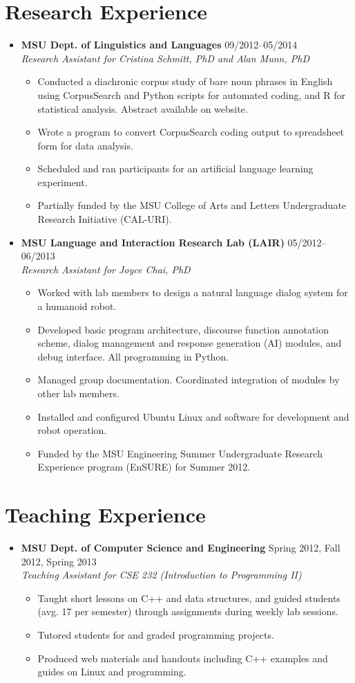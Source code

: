 \documentclass[10pt,oneside]{article}
\newcommand{\ressection}[1]{
	\vspace{-12pt}
	\section*{#1}
}
\newcommand{\resbigitem}[4]{
	\item
	\textbf{#1} \hfill #2 \\
	\textit{#3} \hfill \textit{#4}
}
\begin{document}
\ressection{Research Experience}

\begin{itemize}
	\resbigitem{MSU Dept. of Linguistics and Languages}
		{09/2012--05/2014}
		{Research Assistant for Cristina Schmitt, PhD and Alan Munn, PhD}
		{}
	\begin{itemize}
		\item{Conducted a diachronic corpus study of bare noun phrases in English using CorpusSearch and Python scripts for automated coding, and R for statistical analysis. Abstract available on website.}
		\item{Wrote a program to convert CorpusSearch coding output to spreadsheet form for data analysis.}
		\item{Scheduled and ran participants for an artificial language learning experiment.}
		\item{Partially funded by the MSU College of Arts and Letters Undergraduate Research Initiative (CAL-URI).}
	\end{itemize}
	
	\resbigitem{MSU Language and Interaction Research Lab (LAIR)}
		{05/2012--06/2013}
		{Research Assistant for Joyce Chai, PhD}
		{}
	\begin{itemize}
		\item{Worked with lab members to design a natural language dialog system for a humanoid robot.}
		\item{Developed basic program architecture, discourse function annotation scheme, dialog management and response generation (AI) modules, and debug interface. All programming in Python.}
		\item{Managed group documentation. Coordinated integration of modules by other lab members.}
		\item{Installed and configured Ubuntu Linux and software for development and robot operation.}
		\item{Funded by the MSU Engineering Summer Undergraduate Research Experience program (EnSURE) for Summer 2012.}
	\end{itemize}
\end{itemize}


\ressection{Teaching Experience}

\begin{itemize}
	\resbigitem{MSU Dept. of Computer Science and Engineering}
		{Spring 2012, Fall 2012, Spring 2013}
		{Teaching Assistant for CSE 232 (Introduction to Programming II)}
		{}
	\begin{itemize}
		\item{Taught short lessons on C++ and data structures, and guided students (avg. 17 per semester) through assignments during weekly lab sessions.}
		\item{Tutored students for and graded programming projects.}
		\item{Produced web materials and handouts including C++ examples and guides on Linux and programming.}
	\end{itemize}
\end{itemize}
\end{document}
